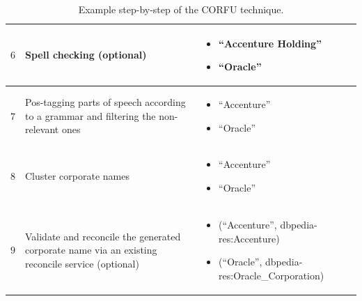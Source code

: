 \documentclass{llncs}
\begin{document}
\begin{table}[!htb]
\begin{center}
\begin{tabular}{|p{1cm}|p{5.5cm}|p{5.5cm}|}
  $6$ & Spell checking (optional) & \begin{itemize}  \item  ``Accenture Holding'' \item  ``Oracle'' \end{itemize} \\ \hline
  $7$ & Pos-tagging parts of speech according to a grammar and filtering the non-relevant ones & \begin{itemize}  \item  ``Accenture'' \item  ``Oracle'' \end{itemize} \\ \hline
  $8$ & Cluster corporate names & \begin{itemize}  \item  ``Accenture'' \item  ``Oracle'' \end{itemize} \\ \hline
  $9$ & Validate and reconcile the generated corporate name via an existing reconcile service (optional) & \begin{itemize}  \item  (``Accenture'', dbpedia-res:Accenture) \item  (``Oracle'', dbpedia-res:Oracle\_Corporation) \end{itemize} \\ \hline
  \hline
  \end{tabular}
  \caption{Example step-by-step of the CORFU technique.}
  \label{tabla:corfu-examples}
  \end{center}
\end{table} 
\end{document}
